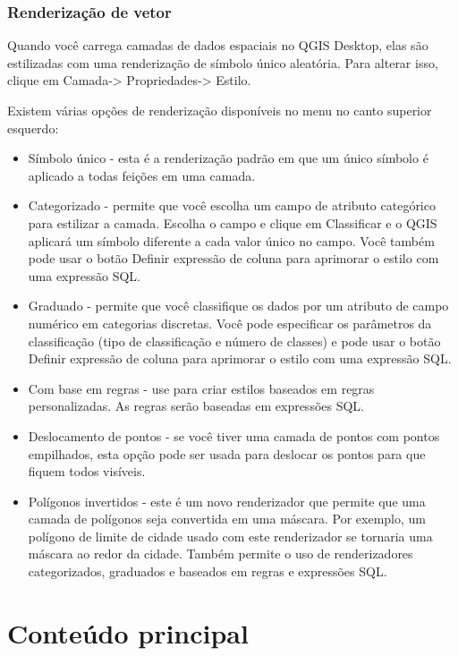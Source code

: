\documentclass[
]{book}
\providecommand{\tightlist}{%
  \setlength{\itemsep}{0pt}\setlength{\parskip}{0pt}}
\begin{document}
\hypertarget{renderizauxe7uxe3o-de-vetor}{%
\subsubsection{\texorpdfstring{\textbf{Renderização de vetor}}{Renderização de vetor}}\label{renderizauxe7uxe3o-de-vetor}}

Quando você carrega camadas de dados espaciais no QGIS Desktop, elas são estilizadas com uma renderização de símbolo único aleatória. Para alterar isso, clique em Camada-\textgreater{} Propriedades-\textgreater{} Estilo.

Existem várias opções de renderização disponíveis no menu no canto superior esquerdo:

\begin{itemize}
\tightlist
\item
  Símbolo único - esta é a renderização padrão em que um único símbolo é aplicado a todas feições em uma camada.
\item
  Categorizado - permite que você escolha um campo de atributo categórico para estilizar a camada. Escolha o campo e clique em Classificar e o QGIS aplicará um símbolo diferente a cada valor único no campo. Você também pode usar o botão Definir expressão de coluna para aprimorar o estilo com uma expressão SQL.
\item
  Graduado - permite que você classifique os dados por um atributo de campo numérico em categorias discretas. Você pode especificar os parâmetros da classificação (tipo de classificação e número de classes) e pode usar o botão Definir expressão de coluna para aprimorar o estilo com uma expressão SQL.
\item
  Com base em regras - use para criar estilos baseados em regras personalizadas. As regras serão baseadas em expressões SQL.
\item
  Deslocamento de pontos - se você tiver uma camada de pontos com pontos empilhados, esta opção pode ser usada para deslocar os pontos para que fiquem todos visíveis.
\item
  Polígonos invertidos - este é um novo renderizador que permite que uma camada de polígonos seja convertida em uma máscara. Por exemplo, um polígono de limite de cidade usado com este renderizador se tornaria uma máscara ao redor da cidade. Também permite o uso de renderizadores categorizados, graduados e baseados em regras e expressões SQL.
\end{itemize}

\hypertarget{conteuxfado-principal-4}{%
\section{Conteúdo principal}\label{conteuxfado-principal-4}}
\end{document}
